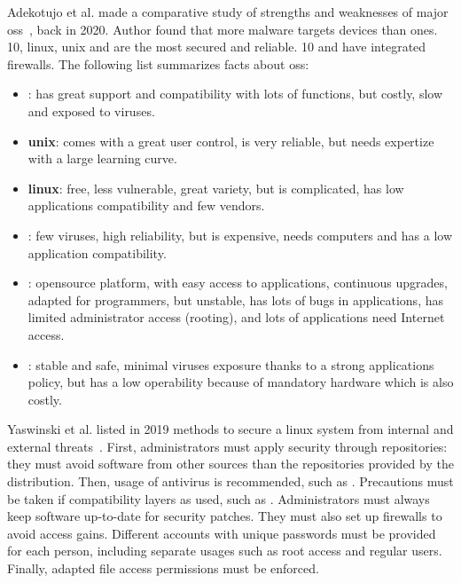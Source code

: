 Adekotujo et al. made a comparative study of strengths and weaknesses of major \glspl{os}~\cite{adekotujo_comparative_2020}, back in 2020. Author found that more malware targets  devices than  ones.  10, \gls{linux}, \gls{unix} and  are the most secured and reliable.  10 and  have integrated firewalls. The following list summarizes facts about \glspl{os}:
\begin{itemize}
	\item \textbf{}: has great support and compatibility with lots of functions, but costly, slow and exposed to viruses.
	\item \textbf{\gls{unix}}: comes with a great user control, is very reliable, but needs expertize with a large learning curve.
	\item \textbf{\gls{linux}}: free, less vulnerable, great variety, but is complicated, has low applications compatibility and few vendors.
	\item \textbf{}: few viruses, high reliability, but is expensive, needs  computers and has a low application compatibility. %
	\item \textbf{}: \gls{opensource} platform, with easy access to applications, continuous upgrades, adapted for programmers, but unstable, has lots of bugs in applications, has limited administrator access (rooting), and lots of applications need Internet access.
	\item \textbf{}: stable and safe, minimal viruses exposure thanks to a strong applications policy, but has a low operability because of mandatory  hardware which is also costly. 
\end{itemize}

Yaswinski et al. listed in 2019 methods to secure a \gls{linux} system from internal and external threats~\cite{yaswinski_linux_2019}. First, administrators must apply security through repositories: they must avoid software from other sources than the repositories provided by the distribution. Then, usage of antivirus is recommended, such as . Precautions must be taken if compatibility layers as used, such as . Administrators must always keep software up-to-date for security patches. They must also set up firewalls to avoid access gains. Different accounts with unique passwords must be provided for each person, including separate usages such as root access and regular users. Finally, adapted file access permissions must be enforced. %

